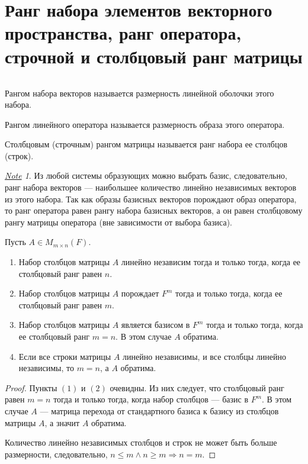 \documentclass[11pt]{book}
\renewcommand{\le}{\leqslant}
\renewcommand{\ge}{\geqslant}
\theoremstyle{definition}
\theoremstyle{plain}
\theoremstyle{plain}
\theoremstyle{definition}
\theoremstyle{remark}
\newtheorem*{note}{\underline{Note}}
\begin{document}
\section{Ранг набора элементов векторного пространства, ранг оператора, строчной и столбцовый ранг матрицы}
\begin{defn}
    $ $
    \begin{description}[noitemsep]
	\item {\sf Рангом набора векторов} называется размерность линейной оболочки этого набора.
	\item {\sf Рангом линейного оператора} называется размерность образа этого оператора.
	\item {\sf Столбцовым (строчным) рангом матрицы} называется ранг набора ее столбцов (строк).
    \end{description}
\end{defn}
\begin{note}
    Из любой системы образующих можно выбрать базис, следовательно, ранг набора векторов --- наибольшее количество линейно независимых векторов из этого набора. Так как образы базисных векторов порождают образ оператора, то ранг оператора равен рангу набора базисных векторов, а он равен столбцовому рангу матрицы оператора (вне зависимости от выбора базиса).
\end{note}
\begin{thm}
    Пусть $ A \in M_{m \times n}(F)$.
    \begin{enumerate}[noitemsep,label={\rm (\arabic*)}]
	\item Набор столбцов матрицы $ A$ линейно независим  тогда и только тогда, когда ее столбцовый ранг равен $ n$.
	\item Набор столбцов матрицы  $ A$ порождает  $ F^{m}$ тогда и только тогда, когда ее столбцовый ранг равен $ m$.
	\item Набор столбцов матрицы $ A$ является базисом в  $ F^{m}$ тогда и только тогда, когда ее столбцовый ранг $ m = n$. В этом случае  $ A$ обратима.
	\item Если все строки матрицы $ A$ линейно независимы, и все столбцы линейно независимы, то $ m = n$, а  $ A$ обратима.
    \end{enumerate}
\end{thm}
\begin{proof}
    Пункты $ (1)$ и  $ (2)$ очевидны. Из них следует, что столбцовый ранг равен $ m = n$  тогда и только тогда, когда набор столбцов --- базис в $ F^{m}$. В этом случае $ A$ --- матрица перехода от стандартного базиса к базису из столбцов матрицы  $ A$, а значит  $ A$ обратима.

    Количество линейно независимых столбцов и строк не может быть больше размерности, следовательно,  $ n \le m \wedge n \ge m \Longrightarrow n = m$.
\end{proof}
\end{document}

